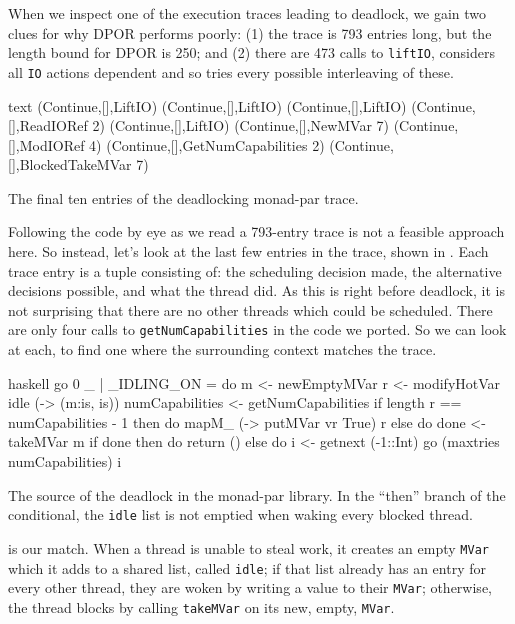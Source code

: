 When we inspect one of the execution traces leading to deadlock, we
gain two clues for why DPOR performs poorly: (1) the trace is 793
entries long, but the length bound for DPOR is 250; and (2) there are
473 calls to \verb|liftIO|, \dejafu{} considers all \verb|IO| actions
dependent and so tries every possible interleaving of these.

\begin{listing}
\centering
\begin{cminted}{text}
(Continue,[],LiftIO)
(Continue,[],LiftIO)
(Continue,[],LiftIO)
(Continue,[],ReadIORef 2)
(Continue,[],LiftIO)
(Continue,[],NewMVar 7)
(Continue,[],ModIORef 4)
(Continue,[],GetNumCapabilities 2)
(Continue,[],BlockedTakeMVar 7)
\end{cminted}
\caption{The final ten entries of the deadlocking monad-par trace.}\label{lst:parmonad_example3}
\end{listing}

Following the code by eye as we read a 793-entry trace is not a
feasible approach here.  So instead, let's look at the last few
entries in the trace, shown in .  Each
trace entry is a tuple consisting of: the scheduling decision made,
the alternative decisions possible, and what the thread did.  As this
is right before deadlock, it is not surprising that there are no other
threads which could be scheduled.  There are only four calls to
\verb|getNumCapabilities| in the code we ported.  So we can look at
each, to find one where the surrounding context matches the trace.

\begin{listing}
\centering
\begin{cminted}{haskell}
go 0 _ | _IDLING_ON =
  do m <- newEmptyMVar
     r <- modifyHotVar idle (\is -> (m:is, is))
     numCapabilities <- getNumCapabilities
     if length r == numCapabilities - 1
       then do
         mapM_ (\vr -> putMVar vr True) r
       else do
         done <- takeMVar m
         if done
           then do
             return ()
           else do
             i <- getnext (-1::Int)
             go (maxtries numCapabilities) i
\end{cminted}
\caption[The source of the deadlock in the monad-par library.]{The source of the deadlock in the monad-par library.  In the ``then'' branch of the conditional, the \texttt{idle} list is not emptied when waking every blocked thread.}\label{lst:parmonad_example4}
\end{listing}

 is our match.  When a thread is unable to
steal work, it creates an empty \verb|MVar| which it adds to a shared
list, called \verb|idle|; if that list already has an entry for every
other thread, they are woken by writing a value to their \verb|MVar|;
otherwise, the thread blocks by calling \verb|takeMVar| on its new,
empty, \verb|MVar|.

